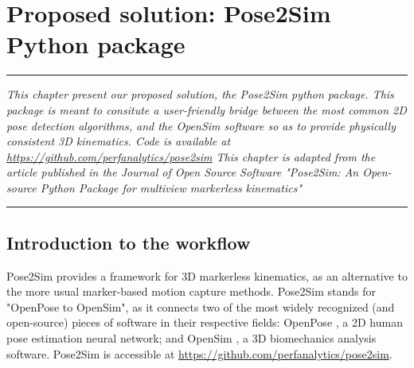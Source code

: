 
\lhead[\fancyplain{}{\leftmark}]%
      {\fancyplain{}{}} %
\chead[\fancyplain{}{}]%
      {\fancyplain{}{}}
\rhead[\fancyplain{}{}]%
      {\fancyplain{}{\rightmark}}%
\lfoot[\fancyplain{}{}]%
      {\fancyplain{}{}}
\cfoot[\fancyplain{}{\thepage}]%
      {\fancyplain{}{\thepage}} %
\rfoot[\fancyplain{}{}]%
     {\fancyplain{}{\scriptsize}}



\chapter{Proposed solution: Pose2Sim Python package}
\label{ch:3}


\begin{center}
\rule{0.7\linewidth}{.5pt}
\begin{minipage}{0.7\linewidth}
\smallskip

\textit{This chapter present our proposed solution, the Pose2Sim python package. This package is meant to consitute a user-friendly bridge between the most common 2D pose detection algorithms, and the OpenSim software so as to provide physically consistent 3D kinematics. Code is available at \url{https://github.com/perfanalytics/pose2sim} \newline \newline
This chapter is adapted from the article published in the Journal of Open Source Software "Pose2Sim: An Open-source Python Package for multiview markerless kinematics" \cite{Pagnon2022b}}

\end{minipage}
\smallskip
\rule{0.7\linewidth}{.5pt}
\end{center}

\minitoc
\newpage


\section{Introduction to the workflow}
Pose2Sim provides a framework for 3D markerless kinematics, as an alternative to the more usual marker-based motion capture methods. Pose2Sim stands for "OpenPose to OpenSim", as it connects two of the most widely recognized (and open-source) pieces of software in their respective fields: OpenPose \cite{Cao2019}, a 2D human pose estimation neural network; and OpenSim \cite{Delp2007,Seth2018}, a 3D biomechanics analysis software. Pose2Sim is accessible at \url{https://github.com/perfanalytics/pose2sim}.

